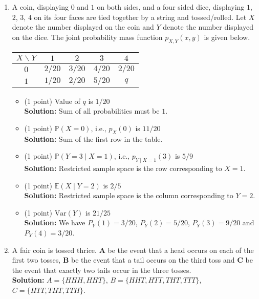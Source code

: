 \documentclass[11pt]{article}
\newcommand{\bkt}[1]{\left( #1\right)}
\newcommand{\Eb}{\mathbb{E}}
\newcommand{\Pb}{\mathbb{P}}
\newcommand{\point}{(1 point) }
\newcommand{\fillans}[1]{\hfill$\boxed{#1}$}
\newcommand{\soln}[1]{\textbf{Solution:} #1}
\begin{document}
\begin{enumerate}
\begin{itemize}
{		}
	\end{itemize}
	\item
	A coin, displaying $0$ and $1$ on both sides, and a four sided dice, displaying $1$, $2$, $3$, $4$ on its four faces are tied together by a string and tossed/rolled. Let $X$ denote the number displayed on the coin and $Y$ denote the number displayed on the dice. The joint probability mass function $p_{X,Y}\bkt{x,y}$ is given below.
	\begin{center}
		\begin{tabular}{|c|c|c|c|c|}
			\hline
			$X \backslash Y$& $1$ & $2$ & $3$ & $4$\\
			\hline
			$0$ & $2/20$ & $3/20$ & $4/20$ & $2/20$\\
			\hline
			$1$ & $1/20$ & $2/20$ & $5/20$ & $q$\\
			\hline
		\end{tabular}
	\end{center}
	\begin{itemize}
		\item
		\point Value of $q$ is \fillans{1/20}\\
		\soln{
		Sum of all probabilities must be $1$.
		}
		\item
		\point $\Pb(X=0)$, i.e., $p_X(0)$ is \fillans{11/20}\\
		\soln{Sum of the first row in the table.}
		\item
		\point $\Pb(Y=3 \mid X=1)$, i.e., $p_{Y\mid X=1}(3)$ is \fillans{5/9}\\
		\soln{Restricted sample space is the row corresponding to $X=1$.}
		\item
		\point $\Eb\bkt{X \mid Y=2}$ is \fillans{2/5}\\
		\soln{Restricted sample space is the column corresponding to $Y=2$.}
		\item
		\point $\text{Var}\bkt{Y}$ is \fillans{21/25}\\
		\soln{
		We have $P_Y(1) = 3/20$, $P_Y(2) = 5/20$, $P_Y(3) = 9/20$ and $P_Y(4) = 3/20$.
		}
	\end{itemize}
	\item
	A fair coin is tossed thrice. $\mathbf{A}$ be the event that a head occurs on each of the first two tosses, $\mathbf{B}$ be the event that a tail occurs on the third toss and $\mathbf{C}$ be the event that exactly two tails occur in the three tosses.\\
	\soln{$A = \{HHH,HHT\}$, $B = \{HHT,HTT,THT,TTT\}$, $C = \{HTT,THT,TTH\}$.}
	\begin{itemize}

\end{itemize}
\end{enumerate}
\end{document}
